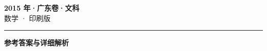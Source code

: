 \documentclass[zihao=5, a4paper]{ctexart}
\begin{document}
\begin{center}
  {\Large\bfseries 2015 年·广东卷·文科}\\[4pt]
  {\large 数学 · 印刷版}
\end{center}
\medskip
{}

\par\bigskip\hrule\bigskip
{}
\begin{center}{\large\bfseries 参考答案与详细解析}\end{center}
\smallskip

\end{document}
